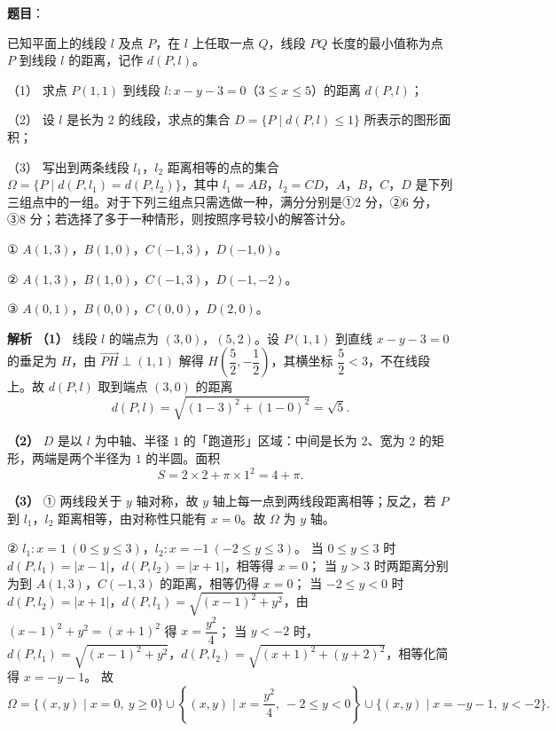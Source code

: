 \begin{answer}

\textbf{题目}：

已知平面上的线段 $l$ 及点 $P$，在 $l$ 上任取一点 $Q$，线段 $PQ$ 长度的最小值称为点 $P$ 到线段 $l$ 的距离，记作 $d(P,l)$。

（1） 求点 $P(1,1)$ 到线段 $l:x-y-3=0$（$3\leqslant x\leqslant5$）的距离 $d(P,l)$；

（2） 设 $l$ 是长为 $2$ 的线段，求点的集合 $D=\{P\mid d(P,l)\leqslant1\}$ 所表示的图形面积；

（3） 写出到两条线段 $l_1$，$l_2$ 距离相等的点的集合 $\Omega=\{P\mid d(P,l_1)=d(P,l_2)\}$，其中 $l_1=AB$，$l_2=CD$，$A$，$B$，$C$，$D$ 是下列三组点中的一组。对于下列三组点只需选做一种，满分分别是①2 分，②6 分，③8 分；若选择了多于一种情形，则按照序号较小的解答计分。

① $A(1,3)$，$B(1,0)$，$C(-1,3)$，$D(-1,0)$。

② $A(1,3)$，$B(1,0)$，$C(-1,3)$，$D(-1,-2)$。

③ $A(0,1)$，$B(0,0)$，$C(0,0)$，$D(2,0)$。

\clearpage

\textbf{解析}
\textbf{（1）} 线段 $l$ 的端点为 $(3,0)$，$(5,2)$。设 $P(1,1)$ 到直线 $x-y-3=0$ 的垂足为 $H$，由 $\overrightarrow{PH}\perp(1,1)$ 解得 $H\left(\dfrac52,-\dfrac12\right)$，其横坐标 $\dfrac52<3$，不在线段上。故 $d(P,l)$ 取到端点 $(3,0)$ 的距离
\nopagebreak[4]
\[d(P,l)=\sqrt{(1-3)^2+(1-0)^2}=\sqrt5.\]

\textbf{（2）} $D$ 是以 $l$ 为中轴、半径 $1$ 的「跑道形」区域：中间是长为 $2$、宽为 $2$ 的矩形，两端是两个半径为 $1$ 的半圆。面积
\nopagebreak[4]
\[S=2\times2+\pi\times1^2=4+\pi.\]

\textbf{（3）} ① 两线段关于 $y$ 轴对称，故 $y$ 轴上每一点到两线段距离相等；反之，若 $P$ 到 $l_1$，$l_2$ 距离相等，由对称性只能有 $x=0$。故 $\Omega$ 为 $y$ 轴。

② $l_1:x=1\ (0\leqslant y\leqslant3)$，$l_2:x=-1\ (-2\leqslant y\leqslant3)$。
当 $0\leqslant y\leqslant3$ 时 $d(P,l_1)=|x-1|$，$d(P,l_2)=|x+1|$，相等得 $x=0$；
当 $y>3$ 时两距离分别为到 $A(1,3)$，$C(-1,3)$ 的距离，相等仍得 $x=0$；
当 $-2\leqslant y<0$ 时 $d(P,l_2)=|x+1|$，$d(P,l_1)=\sqrt{(x-1)^2+y^2}$，由 $(x-1)^2+y^2=(x+1)^2$ 得 $x=\dfrac{y^2}4$；
当 $y<-2$ 时，$d(P,l_1)=\sqrt{(x-1)^2+y^2}$，$d(P,l_2)=\sqrt{(x+1)^2+(y+2)^2}$，相等化简得 $x=-y-1$。
故
\nopagebreak[4]
\[\Omega=\{(x,y)\mid x=0,\ y\geqslant0\}\cup\left\{(x,y)\mid x=\frac{y^2}4,\ -2\leqslant y<0\right\}\cup\{(x,y)\mid x=-y-1,\ y<-2\}.\]


\end{answer}
